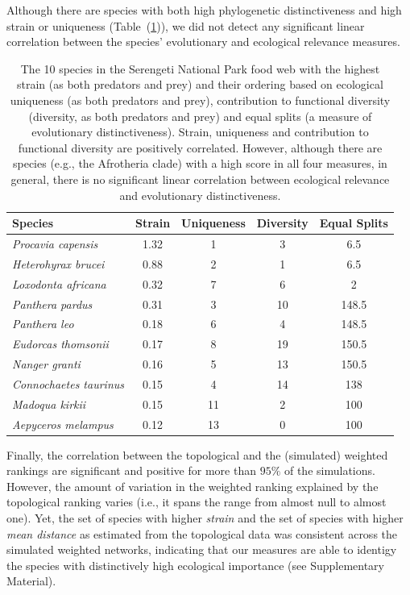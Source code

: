 \documentclass[]{rsos}%
\begin{document}
Although there are species with both high phylogenetic distinctiveness and high
strain or uniqueness (Table~(\ref{tab:strain_1})), we did not detect any significant linear
correlation between the species' evolutionary and ecological relevance measures.

\begin {table}[hbt]
\begin{tabular}{|l|*{4}{c|}}
\hline
Species	&Strain	&Uniqueness	&Diversity &Equal Splits\\
\hline
\emph{Procavia capensis}	&1.32	&1	&3	&6.5\\
\emph{Heterohyrax brucei}	&0.88	&2	&1	&6.5\\
\emph{Loxodonta africana}	&0.32	&7	&6	&2\\
\emph{Panthera pardus}		&0.31	&3	&10	&148.5\\
\emph{Panthera leo}		&0.18	&6	&4	&148.5\\
\emph{Eudorcas thomsonii}	&0.17	&8	&19	&150.5\\
\emph{Nanger granti}		&0.16	&5	&13	&150.5\\
\emph{Connochaetes taurinus}	&0.15	&4	&14	&138\\
\emph{Madoqua kirkii}		&0.15	&11	&2	&100\\
\emph{Aepyceros melampus}	&0.12	&13	&0	&100\\
\hline
\end{tabular}
\caption{The 10 species in the Serengeti National Park food web
\citep{baskerville2011spatial} with the highest strain (as both predators and prey)
and their ordering based on ecological uniqueness  (as both predators and
prey), contribution to functional diversity (diversity, as both predators and
prey) and equal splits (a measure of evolutionary distinctiveness). Strain,
uniqueness and contribution to functional diversity are positively correlated.
However, although there are species (e.g., the Afrotheria clade) with a high
score in all four measures, in general, there is no significant linear correlation between
ecological relevance and evolutionary distinctiveness.}\label{tab:strain_1}
\end{table}

Finally, the correlation between the topological and the (simulated) weighted rankings are
significant and positive for more than $95\%$ of the simulations. However, the amount of variation in the weighted
ranking explained by the topological ranking varies (i.e., it spans the range from almost null
to almost one). Yet, the set of species with higher \emph{strain} and the set of species with higher \emph{mean distance}
as estimated from the topological data was consistent across the simulated weighted networks, indicating
that our measures are able to identigy the species with distinctively high ecological importance (see Supplementary Material).
\end{document}
